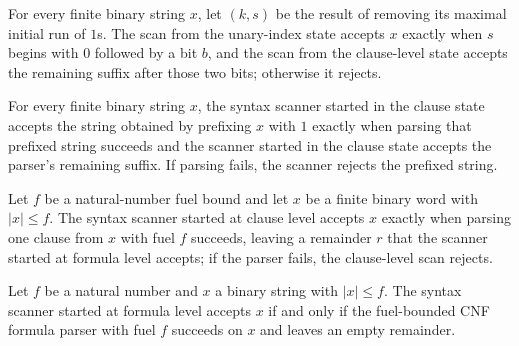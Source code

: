 \begin{lemma}
\label{Complexity.taut_syntax_unary}
\leanok
{}
For every finite binary string $x$, let $(k,s)$ be the result of removing its maximal
initial run of $1$s. The scan from the unary-index state accepts $x$ exactly when $s$
begins with $0$ followed by a bit $b$, and the scan from the clause-level state accepts
the remaining suffix after those two bits; otherwise it rejects.
\end{lemma}

\begin{lemma}
\label{Complexity.taut_syntax_literal}
\leanok
{}
For every finite binary string $x$, the syntax scanner started in the clause state
accepts the string obtained by prefixing $x$ with $1$ exactly when parsing that prefixed
string succeeds and the scanner started in the clause state accepts the parser's
remaining suffix. If parsing fails, the scanner rejects the prefixed string.
\end{lemma}

\begin{lemma}
\label{Complexity.taut_syntax_clause}
\leanok
{}
Let $f$ be a natural-number fuel bound and let $x$ be a finite binary word with $|x|\le
f$. The syntax scanner started at clause level accepts $x$ exactly when parsing one
clause from $x$ with fuel $f$ succeeds, leaving a remainder $r$ that the scanner started
at formula level accepts; if the parser fails, the clause-level scan rejects.
\end{lemma}

\begin{lemma}
\label{Complexity.taut_syntax_formula}
\leanok
{}
Let $f$ be a natural number and $x$ a binary string with $|x|\le f$. The syntax scanner
started at formula level accepts $x$ if and only if the fuel-bounded CNF formula parser
with fuel $f$ succeeds on $x$ and leaves an empty remainder.
\end{lemma}

